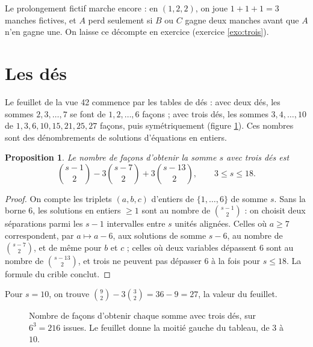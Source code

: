 \documentclass[11pt,a4paper]{article}
\theoremstyle{plain}
\newtheorem{proposition}[theoreme]{Proposition}
\theoremstyle{definition}
\theoremstyle{remark}
\begin{document}
Le prolongement fictif marche encore : en $(1,2,2)$, on joue $1+1+1=3$ manches fictives, et $A$ perd seulement si $B$ ou $C$ gagne deux manches avant que $A$ n'en gagne une. On laisse ce décompte en exercice (exercice \ref{exo:trois}).

\section{Les dés}\label{sec:des}

Le feuillet de la vue 42 commence par les tables de dés : avec deux dés, les sommes $2,3,\dots,7$ se font de $1,2,\dots,6$ façons ; avec trois dés, les sommes $3,4,\dots,10$ de $1,3,6,10,15,21,25,27$ façons, puis symétriquement (figure \ref{fig:troisdes}). Ces nombres sont des dénombrements de solutions d'équations en entiers.

\begin{proposition}\label{prop:troisdes}
Le nombre de façons d'obtenir la somme $s$ avec trois dés est
\[
  \binom{s-1}2-3\binom{s-7}2+3\binom{s-13}2 ,\qquad 3\leq s\leq18 .
\]
\end{proposition}

\begin{proof}
On compte les triplets $(a,b,c)$ d'entiers de $\{1,\dots,6\}$ de somme $s$. Sans la borne $6$, les solutions en entiers $\geq1$ sont au nombre de $\binom{s-1}2$ : on choisit deux séparations parmi les $s-1$ intervalles entre $s$ unités alignées. Celles où $a\geq7$ correspondent, par $a\mapsto a-6$, aux solutions de somme $s-6$, au nombre de $\binom{s-7}2$, et de même pour $b$ et $c$ ; celles où deux variables dépassent $6$ sont au nombre de $\binom{s-13}2$, et trois ne peuvent pas dépasser $6$ à la fois pour $s\leq18$. La formule du crible conclut.
\end{proof}

Pour $s=10$, on trouve $\binom92-3\binom32=36-9=27$, la valeur du feuillet.

\begin{figure}[h]
\centering
{}
\caption{Nombre de façons d'obtenir chaque somme avec trois dés, sur $6^3=216$ issues. Le feuillet donne la moitié gauche du tableau, de $3$ à $10$.}\label{fig:troisdes}
\end{figure}
\end{document}
